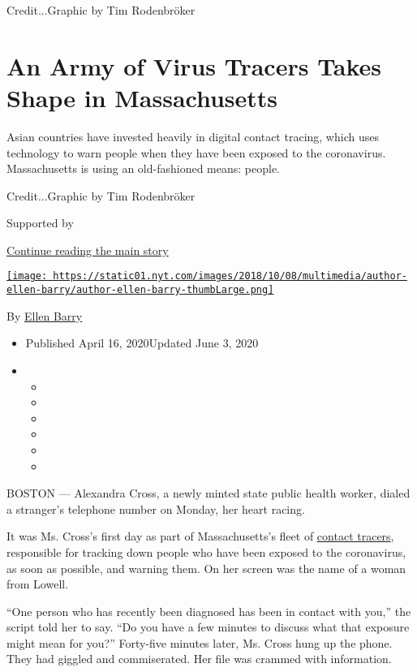Credit...Graphic by Tim Rodenbröker

\hypertarget{an-army-of-virus-tracers-takes-shape-in-massachusetts}{%
\section{An Army of Virus Tracers Takes Shape in
Massachusetts}\label{an-army-of-virus-tracers-takes-shape-in-massachusetts}}

Asian countries have invested heavily in digital contact tracing, which
uses technology to warn people when they have been exposed to the
coronavirus. Massachusetts is using an old-fashioned means: people.

Credit...Graphic by Tim Rodenbröker

Supported by

\protect\hyperlink{after-sponsor}{Continue reading the main story}

\href{https://www.nytimes.com/by/ellen-barry}{\texttt{[image: https://static01.nyt.com/images/2018/10/08/multimedia/author-ellen-barry/author-ellen-barry-thumbLarge.png]}}

By \href{https://www.nytimes.com/by/ellen-barry}{Ellen Barry}

\begin{itemize}
\item
  Published April 16, 2020Updated June 3, 2020
\item
  \begin{itemize}
  \item
  \item
  \item
  \item
  \item
  \item
  \end{itemize}
\end{itemize}

BOSTON --- Alexandra Cross, a newly minted state public health worker,
dialed a stranger's telephone number on Monday, her heart racing.

It was Ms. Cross's first day as part of Massachusetts's fleet of
\href{https://www.nytimes.com/2020/06/03/health/coronavirus-contact-tracing-apps.html}{contact
tracers}, responsible for tracking down people who have been exposed to
the coronavirus, as soon as possible, and warning them. On her screen
was the name of a woman from Lowell.

``One person who has recently been diagnosed has been in contact with
you,'' the script told her to say. ``Do you have a few minutes to
discuss what that exposure might mean for you?'' Forty-five minutes
later, Ms. Cross hung up the phone. They had giggled and commiserated.
Her file was crammed with information.

